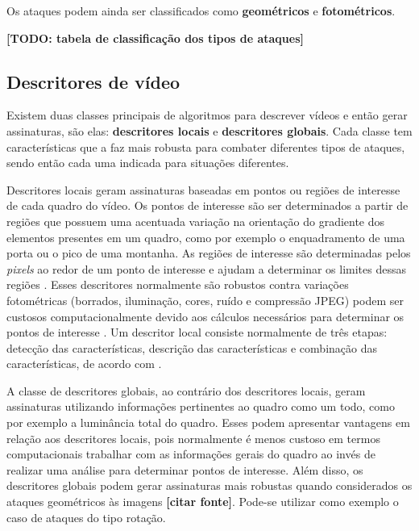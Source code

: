 Os ataques podem ainda ser classificados como \textbf{geométricos} e \textbf{fotométricos}.

\textbf{[TODO: tabela de classificação dos tipos de ataques]}

\subsection{Descritores de vídeo}
    
    Existem duas classes principais de algoritmos para descrever vídeos e então gerar assinaturas, são elas: \textbf{descritores locais} e \textbf{descritores globais}. Cada classe tem características que a faz mais robusta para combater diferentes tipos de ataques, sendo então cada uma indicada para situações diferentes.
    
    Descritores locais geram assinaturas baseadas em pontos ou regiões de interesse de cada quadro do vídeo. Os pontos de interesse são ser determinados a partir de regiões que possuem uma acentuada variação na orientação do gradiente dos elementos presentes em um quadro, como por exemplo o enquadramento de uma porta ou o pico de uma montanha. As regiões de interesse são determinadas pelos \textit{pixels} ao redor de um ponto de interesse e ajudam a determinar os limites dessas regiões \citeauthor{radhakrishnan2007content}. Esses descritores normalmente são robustos contra variações fotométricas (borrados, iluminação, cores, ruído e compressão JPEG) podem ser custosos computacionalmente devido aos cálculos necessários para determinar os pontos de interesse \citeauthor{naini2014vanishing}. Um descritor local consiste normalmente de três etapas: detecção das características, descrição das características e combinação das características, de acordo com \citeauthor{chen2010zernike}.

    A classe de descritores globais, ao contrário dos descritores locais, geram assinaturas utilizando informações pertinentes ao quadro como um todo, como por exemplo a luminância total do quadro. Esses podem apresentar vantagens em relação aos descritores locais, pois normalmente é menos custoso em termos computacionais trabalhar com as informações gerais do quadro ao invés de realizar uma análise para determinar pontos de interesse. Além disso, os descritores globais podem gerar assinaturas mais robustas quando considerados os ataques geométricos às imagens \textbf{[citar fonte]}. Pode-se utilizar como exemplo o caso de ataques do tipo rotação. 
    
